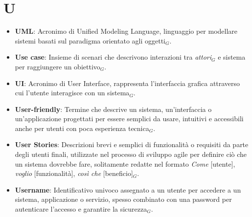 \section{U}
\begin{itemize}
    \item \textbf{UML}: Acronimo di Unified Modeling Language, linguaggio per modellare sistemi basati sul paradigma orientato agli oggetti$_G$.
    \item \textbf{Use case}: Insieme di scenari che descrivono interazioni tra \textit{attori}$_G$ e sistema per raggiungere un obiettivo$_G$.
    \item \textbf{UI}: Acronimo di User Interface, rappresenta l'interfaccia grafica attraverso cui l'utente interagisce con un sistema$_G$.
    \item \textbf{User-friendly}: Termine che descrive un sistema, un'interfaccia o un'applicazione progettati per essere semplici da usare, intuitivi e accessibili anche per utenti con poca esperienza tecnica$_G$.
    \item \textbf{User Stories}: Descrizioni brevi e semplici di funzionalità o requisiti da parte degli utenti finali, utilizzate nel processo di sviluppo agile per definire ciò che un sistema dovrebbe fare, solitamente redatte nel formato \textit{Come} [utente], \textit{voglio} [funzionalità], \textit{così che} [beneficio]$_G$.
    \item \textbf{Username}: Identificativo univoco assegnato a un utente per accedere a un sistema, applicazione o servizio, spesso combinato con una password per autenticare l'accesso e garantire la sicurezza$_G$.
\end{itemize}
